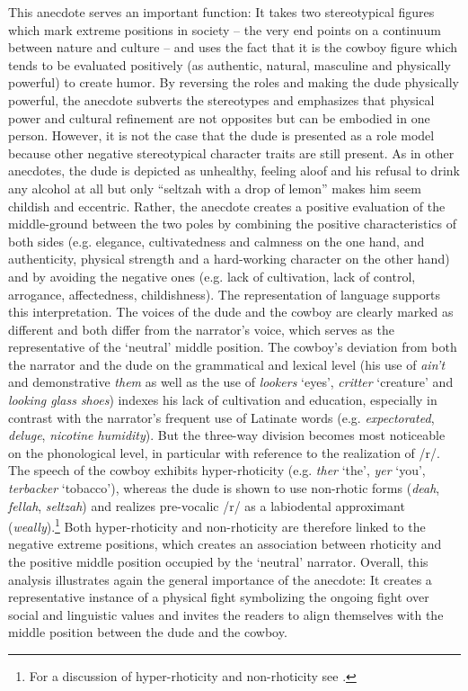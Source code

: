 This anecdote serves an important function: It takes two stereotypical figures which mark extreme positions in society – the very end points on a continuum between nature and culture – and uses the fact that it is the cowboy figure which tends to be evaluated positively (as authentic, natural, masculine and physically powerful) to create humor. By reversing the roles and making the dude physically powerful, the anecdote subverts the stereotypes and emphasizes that physical power and cultural refinement are not opposites but can be embodied in one person. However, it is not the case that the dude is presented as a role model because other negative stereotypical character traits are still present. As in other anecdotes, the dude is depicted as unhealthy, feeling aloof and his refusal to drink any alcohol at all but only “seltzah with a drop of lemon” makes him seem childish and eccentric. Rather, the anecdote creates a positive evaluation of the middle-ground between the two poles by combining the positive characteristics of both sides (e.g. elegance, cultivatedness and calmness on the one hand, and authenticity, physical strength and a hard-working character on the other hand) and by avoiding the negative ones (e.g. lack of cultivation, lack of control, arrogance, affectedness, childishness). The representation of language supports this interpretation. The voices of the dude and the cowboy are clearly marked as different and both differ from the narrator’s voice, which serves as the representative of the ‘neutral’ middle position. The cowboy’s deviation from both the narrator and the dude on the grammatical and lexical level (his use of \emph{ain’t} and demonstrative \emph{them} as well as the use of \emph{lookers} ‘eyes’, \emph{critter} ‘creature’ and \emph{looking glass shoes}) indexes his lack of cultivation and education, especially in contrast with the narrator’s frequent use of Latinate words (e.g. \emph{expectorated}{,} \emph{deluge}{,} \emph{nicotine humidity}). But the three-way division becomes most noticeable on the phonological level, in particular with reference to the realization of /r/. The speech of the cowboy exhibits hyper-rhoticity (e.g. \emph{ther} ‘the’, \emph{yer} ‘you’, \emph{terbacker} ‘tobacco’), whereas the dude is shown to use non-rhotic forms (\emph{deah}, \emph{fellah}, \emph{seltzah}) and realizes pre-vocalic /r/ as a labiodental approximant (\emph{weally}).\footnote{For a discussion of hyper-rhoticity and non-rhoticity see .} Both hyper-rhoticity and non-rhoticity are therefore linked to the negative extreme positions, which creates an association between rhoticity and the positive middle position occupied by the ‘neutral’ narrator. Overall, this analysis illustrates again the general importance of the anecdote: It creates a representative instance of a physical fight symbolizing the ongoing fight over social and linguistic values and invites the readers to align themselves with the middle position between the dude and the cowboy.

